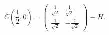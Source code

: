 \begin{equation}
C\left(\frac{1}{2}, 0\right) =
\begin{pmatrix}
\frac{1}{\sqrt{2}} & \frac{1}{\sqrt{2}} \\[4pt]
\frac{1}{\sqrt{2}} & -\frac{1}{\sqrt{2}}
\end{pmatrix} \equiv H.
\label{eq:hadamard_coin}
\end{equation}
